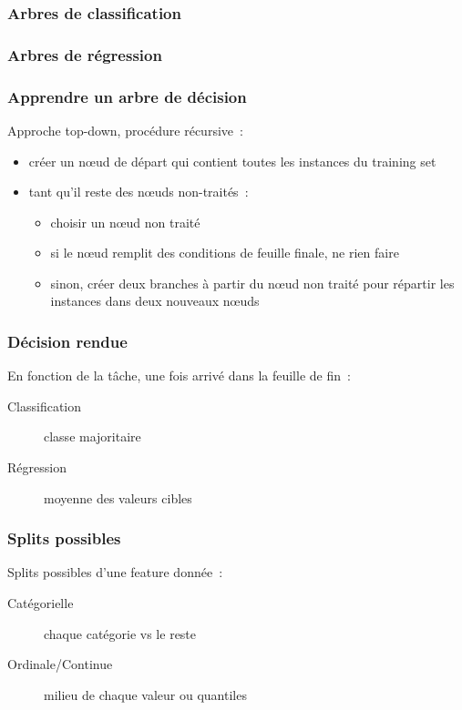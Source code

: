 \documentclass{formation}
\begin{document}
\begin{frame}
  \frametitle{Arbres de classification}
\end{frame}

\begin{frame}
  \frametitle{Arbres de régression}
\end{frame}

\begin{frame}
  \frametitle{Apprendre un arbre de décision}
  
  Approche \og top-down\fg, procédure récursive :
  \begin{itemize}[<+->]
  \item créer un nœud de départ qui contient toutes les instances du
    training set
  \item tant qu'il reste des nœuds non-traités :
    \begin{itemize}
    \item choisir un nœud non traité
    \item si le nœud remplit des conditions de feuille finale, ne rien
      faire
    \item sinon, créer deux branches à partir du nœud non traité
      pour répartir les instances dans deux nouveaux nœuds
    \end{itemize}
  \end{itemize}

\end{frame}

\begin{frame}
  \frametitle{Décision rendue}
  
  En fonction de la tâche, une fois arrivé dans la feuille de fin :
  \begin{description}
  \item[Classification] classe majoritaire
  \item[Régression] moyenne des valeurs cibles
  \end{description}
\end{frame}

\begin{frame}
  \frametitle{Splits possibles}

  Splits possibles d'une feature donnée :

  \begin{description}
  \item[Catégorielle] chaque catégorie vs le reste
  \item[Ordinale/Continue] milieu de chaque valeur ou
    quantiles
  \end{description}
\end{frame}
\end{document}
